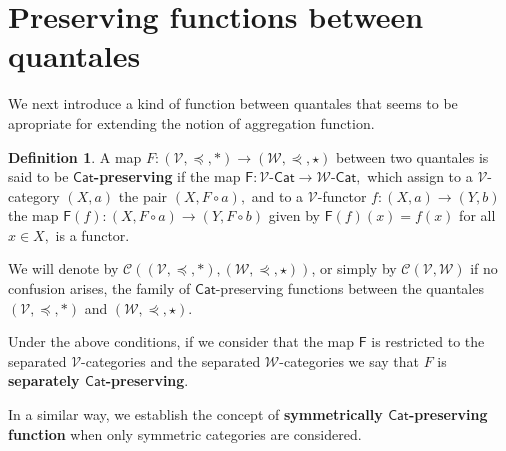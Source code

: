\documentclass[11pt,a4paper]{amsart}
\theoremstyle{definition}
\newtheorem{definition}[theorem]{Definition}
\begin{document}
	
	\section{Preserving functions between quantales}\label{sec:pf}
	
	
	We next introduce a kind of function between quantales that seems to be apropriate for extending the notion of aggregation function.
	
	
	\begin{definition}\label{def:catpreserving}
		A map $F:(\mathscr{V},\preceq,\ast)\to(\mathscr{W},\curlyeqprec,\star)$ between two quantales is said to be \textbf{
			$\mathsf{Cat}$-preserving} if the map $\mathsf{F}:\mathscr{V}\text{-}\mathsf{Cat}\to\mathscr{W}\text{-}\mathsf{Cat},$ which assign to a $\mathscr{V}$-category $(X,a)$ the pair $(X,F\circ a),$ and to a $\mathscr{V}$-functor $f:(X,a)\to (Y,b)$ the map $\mathsf{F}(f):(X,F\circ a)\to (Y,F\circ b)$ given by $\mathsf{F}(f)(x)=f(x)$ for all $x\in X,$ is a functor.
		
		We will denote by $\mathscr{C}((\mathscr{V},\preceq,\ast),(\mathscr{W},\curlyeqprec,\star))$, or simply by $\mathscr{C}(\mathscr{V},\mathscr{W})$ if no confusion arises, the family of $\mathsf{Cat}$-preserving functions between the quantales $(\mathscr{V},\preceq,\ast)$ and $(\mathscr{W},\curlyeqprec,\star).$
		
		Under the above conditions, if we consider that the map $\mathsf{F}$ is restricted to the separated $\mathscr{V}$-categories and the separated $\mathscr{W}$-categories we say that $F$ is \textbf{separately $\mathsf{Cat}$-preserving}.
		
		In a similar way, we establish the concept of \textbf{symmetrically $\mathsf{Cat}$-preser\-ving function} when only symmetric categories are considered.
	\end{definition}
	
\end{document}
